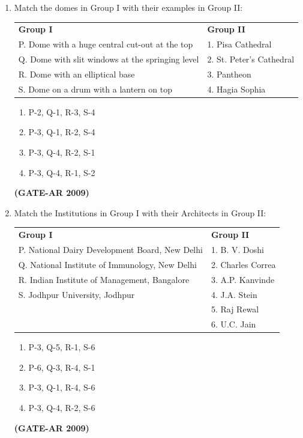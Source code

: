 \documentclass[a4paper,10pt]{article}
\begin{document}
\begin{enumerate}
    \item Match the domes in Group I with their examples in Group II:  \\
    \begin{tabular}{ l l }
	\textbf{Group I} & \textbf{Group II} \\
	P. Dome with a huge central cut-out at the top & 1. Pisa Cathedral \\
	Q. Dome with slit windows at the springing level & 2. St. Peter’s Cathedral \\
	R. Dome with an elliptical base & 3. Pantheon \\
	S. Dome on a drum with a lantern on top & 4. Hagia Sophia \\
	\end{tabular}
	\begin{multicols}{2}
	\begin{enumerate}
        \item P-2, Q-1, R-3, S-4
        \item P-3, Q-1, R-2, S-4
        \item P-3, Q-4, R-2, S-1
        \item P-3, Q-4, R-1, S-2
    \end{enumerate}
	\end{multicols}
    \hfill \textbf{(GATE-AR 2009)}

    \item Match the Institutions in Group I with their Architects in Group II:  \\
    \begin{tabular}{ l l }
	\textbf{Group I} & \textbf{Group II} \\
	P. National Dairy Development Board, New Delhi & 1. B. V. Doshi \\
	Q. National Institute of Immunology, New Delhi & 2. Charles Correa \\
	R. Indian Institute of Management, Bangalore & 3. A.P. Kanvinde \\
	S. Jodhpur University, Jodhpur & 4. J.A. Stein \\
	& 5. Raj Rewal \\
	& 6. U.C. Jain \\
	\end{tabular}
	\begin{multicols}{2}
	\begin{enumerate}
        \item P-3, Q-5, R-1, S-6
        \item P-6, Q-3, R-4, S-1
        \item P-3, Q-1, R-4, S-6
        \item P-3, Q-4, R-2, S-6
    \end{enumerate}
	\end{multicols}
    \hfill \textbf{(GATE-AR 2009)}


\end{enumerate}
\end{document}
